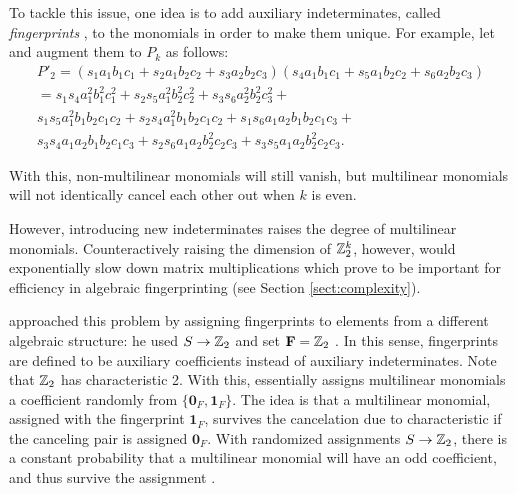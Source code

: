 To tackle this issue, one idea is to add auxiliary indeterminates, 
called \emph{fingerprints} \cite{KouWil15}, to the monomials 
in order to make them unique. For example, let
and augment them to $P_k$ as follows: 
\begin{multline*}
  P'_2 = (s_1a_1b_1c_1 + s_2a_1b_2c_2 + s_3a_2b_2c_3)(s_4a_1b_1c_1 + s_5a_1b_2c_2 + s_6a_2b_2c_3) \\
  = s_1s_4a_1^2b_1^2c_1^2 + s_2s_5a_1^2b_2^2c_2^2 + s_3s_6a_2^2b_2^2c_3^2 + \\
  s_1s_5a_1^2b_1b_2c_1c_2 + s_2s_4a_1^2b_1b_2c_1c_2 + s_1s_6a_1a_2b_1b_2c_1c_3 + \\
  s_3s_4a_1a_2b_1b_2c_1c_3 + s_2s_6a_1a_2b_2^2c_2c_3 + s_3s_5a_1a_2b_2^2c_2c_3. 
\end{multline*}

With this, non-multilinear monomials will still vanish, but multilinear monomials 
will not identically cancel each other out when $k$ is even. 

However, introducing new indeterminates raises the degree of multilinear
monomials. 
Counteractively raising the dimension of $\mathbb Z_2^k$, however, would  
exponentially slow down matrix multiplications which prove to be %
important for efficiency in algebraic fingerprinting (see Section \ref{sect:complexity}).

\citeauthor{Koutis08} approached this problem by assigning fingerprints to elements 
from a different algebraic structure: he used $S \to \mathbb Z_2$ and set 
$\mathbf{F} = \mathbb Z_2$ \cite{Koutis08}. In this sense, 
fingerprints are defined to be auxiliary coefficients instead of auxiliary indeterminates. 
Note that $\mathbb Z_2$ has characteristic 2. With this, 
\citeauthor{Koutis08} essentially assigns multilinear monomials a coefficient 
randomly from $\{\mathbf{0}_F, \mathbf{1}_F\}$. The idea is that a multilinear monomial, 
assigned with the fingerprint $\mathbf{1}_F$,  
survives the cancelation due to characteristic if the canceling pair is assigned $\mathbf{0}_F$. 
With randomized assignments $S \to \mathbb Z_2$, 
there is a constant  probability that a multilinear 
monomial will have an odd coefficient, and thus survive the assignment \cite{Koutis08}.

